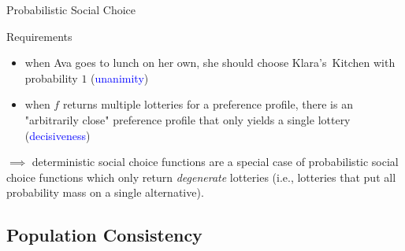\documentclass{beamer}
\theoremstyle{definition}
\def\b{\textcolor{blue}}
\begin{document}
\begin{frame}{Probabilistic Social Choice}
\begin{block}{Requirements}
\begin{itemize}\pause
    \item when Ava goes to lunch on her own, she should choose Klara's~Kitchen with probability $1$ (\b{unanimity})\pause
    \item when $f$ returns multiple lotteries for a preference profile, there is an "arbitrarily close" preference profile that only yields a single lottery (\b{decisiveness})
\end{itemize}
\end{block}\pause
$\implies$ deterministic social choice functions are a special case of probabilistic social choice functions which only return \emph{degenerate} lotteries (i.e., lotteries that put all probability mass on a single alternative).
\end{frame}

\subsection{Population Consistency}
\end{document}
